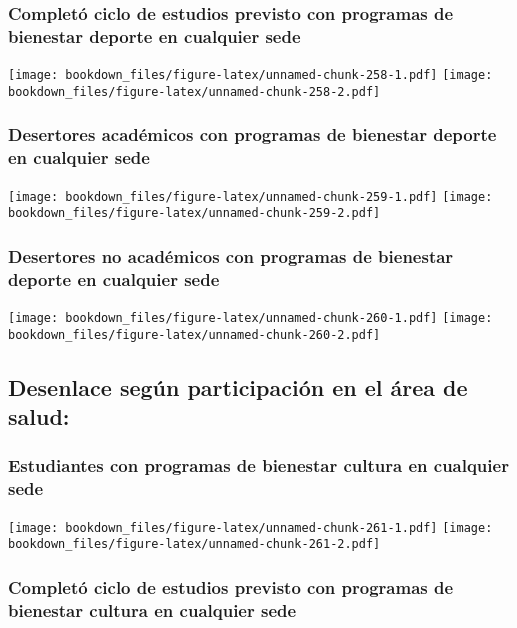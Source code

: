 \documentclass[]{article}
\theoremstyle{definition}
\theoremstyle{definition}
\theoremstyle{definition}
\theoremstyle{remark}
\begin{document}
\subsubsection{Completó ciclo de estudios previsto con programas de
bienestar deporte en cualquier
sede}\label{completo-ciclo-de-estudios-previsto-con-programas-de-bienestar-deporte-en-cualquier-sede-1}

\texttt{[image: bookdown\_files/figure-latex/unnamed-chunk-258-1.pdf]}
\texttt{[image: bookdown\_files/figure-latex/unnamed-chunk-258-2.pdf]}

\subsubsection{Desertores académicos con programas de bienestar deporte
en cualquier
sede}\label{desertores-academicos-con-programas-de-bienestar-deporte-en-cualquier-sede-1}

\texttt{[image: bookdown\_files/figure-latex/unnamed-chunk-259-1.pdf]}
\texttt{[image: bookdown\_files/figure-latex/unnamed-chunk-259-2.pdf]}

\subsubsection{Desertores no académicos con programas de bienestar
deporte en cualquier
sede}\label{desertores-no-academicos-con-programas-de-bienestar-deporte-en-cualquier-sede-1}

\texttt{[image: bookdown\_files/figure-latex/unnamed-chunk-260-1.pdf]}
\texttt{[image: bookdown\_files/figure-latex/unnamed-chunk-260-2.pdf]}

\subsection{Desenlace según participación en el área de
salud:}\label{desenlace-segun-participacion-en-el-area-de-salud-2}

\subsubsection{Estudiantes con programas de bienestar cultura en
cualquier
sede}\label{estudiantes-con-programas-de-bienestar-cultura-en-cualquier-sede-1}

\texttt{[image: bookdown\_files/figure-latex/unnamed-chunk-261-1.pdf]}
\texttt{[image: bookdown\_files/figure-latex/unnamed-chunk-261-2.pdf]}

\subsubsection{Completó ciclo de estudios previsto con programas de
bienestar cultura en cualquier
sede}\label{completo-ciclo-de-estudios-previsto-con-programas-de-bienestar-cultura-en-cualquier-sede-1}
\end{document}
